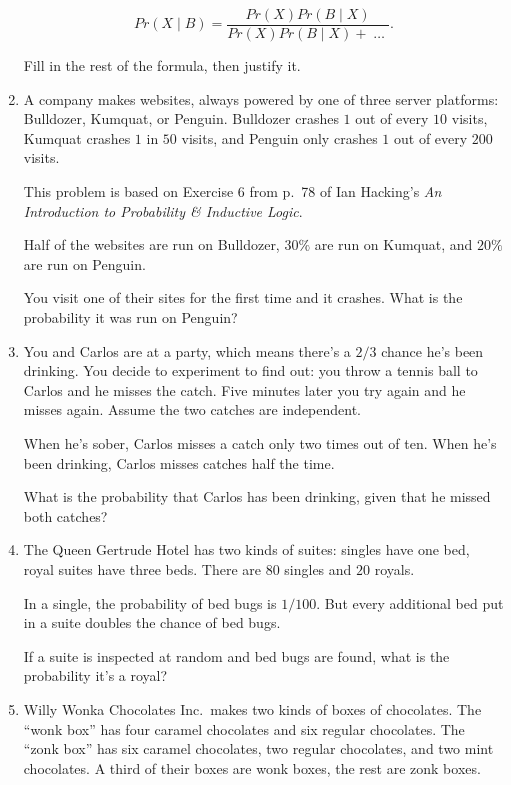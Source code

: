 \documentclass[justified]{tufte-book}
\newcommand{\given}{\mid}
\newcommand{\p}{Pr}
\theoremstyle{definition}
\theoremstyle{definition}
\theoremstyle{definition}
\theoremstyle{remark}
\begin{document}
\begin{enumerate}
  \[ \p(X \given B) = \frac{\p(X)\p(B \given X)}{\p(X)\p(B \given X) + \;\ldots\;}.\]

  Fill in the rest of the formula, then justify it.
\item
  A company makes websites, always powered by one of three server
  platforms: Bulldozer, Kumquat, or Penguin. Bulldozer crashes \(1\) out
  of every \(10\) visits, Kumquat crashes \(1\) in \(50\) visits, and
  Penguin only crashes \(1\) out of every \(200\) visits.

  \begin{marginfigure}
  This problem is based on Exercise 6 from p.~78 of Ian Hacking's \emph{An
  Introduction to Probability \& Inductive Logic}.
  \end{marginfigure}

  Half of the websites are run on Bulldozer, \(30\%\) are run on
  Kumquat, and \(20\%\) are run on Penguin.

  You visit one of their sites for the first time and it crashes. What
  is the probability it was run on Penguin?
\item
  You and Carlos are at a party, which means there's a \(2/3\) chance
  he's been drinking. You decide to experiment to find out: you throw a
  tennis ball to Carlos and he misses the catch. Five minutes later you
  try again and he misses again. Assume the two catches are independent.

  When he's sober, Carlos misses a catch only two times out of ten. When
  he's been drinking, Carlos misses catches half the time.

  What is the probability that Carlos has been drinking, given that he
  missed both catches?
\item
  The Queen Gertrude Hotel has two kinds of suites: singles have one
  bed, royal suites have three beds. There are \(80\) singles and \(20\)
  royals.

  In a single, the probability of bed bugs is \(1/100\). But every
  additional bed put in a suite doubles the chance of bed bugs.

  If a suite is inspected at random and bed bugs are found, what is the
  probability it's a royal?
\item
  Willy Wonka Chocolates Inc.~makes two kinds of boxes of chocolates.
  The ``wonk box'' has four caramel chocolates and six regular
  chocolates. The ``zonk box'' has six caramel chocolates, two regular
  chocolates, and two mint chocolates. A third of their boxes are wonk
  boxes, the rest are zonk boxes.


\end{enumerate}
\end{document}
